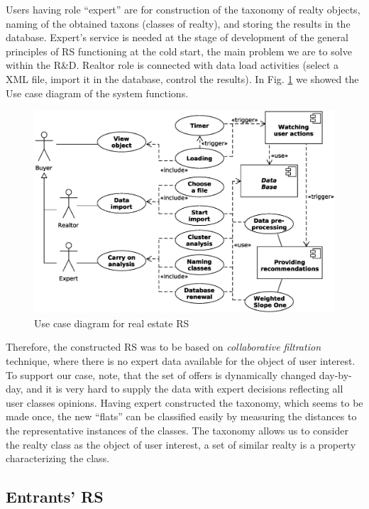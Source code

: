 \documentclass[conference,a4]{IEEEtran}
\begin{document}
Users having role ``expert'' are for construction of the taxonomy of realty objects, naming of the obtained taxons (classes of realty), and storing the results in the database.  Expert's service is needed at the stage of development of the general principles of RS functioning at the cold start, the main problem we are to solve within the R\&D.  Realtor role is connected with data load activities (select a XML file, import it in the database, control the results).  In Fig. \ref{fig:use-case} we showed the Use case diagram of the system functions.

\begin{figure}[tb]
  \centering
  \includegraphics[width=\linewidth]{use_case.eps}
  \caption{Use case diagram for real estate RS}
  \label{fig:use-case}
\end{figure}

Therefore, the constructed RS was to be based on \emph{collaborative filtration} technique, where there is no expert data available for the object of user interest.  To support our case, note, that the set of offers is dynamically changed day-by-day, and it is very hard to supply the data with expert decisions reflecting all user classes opinions.  Having expert constructed the taxonomy, which seems to be made once, the new ``flats'' can be classified easily by measuring the distances to the representative instances of the classes.  The taxonomy allows us to consider the realty class as the object of user interest, a set of similar realty is a property characterizing the class.

\subsection{Entrants' RS}
\end{document}
